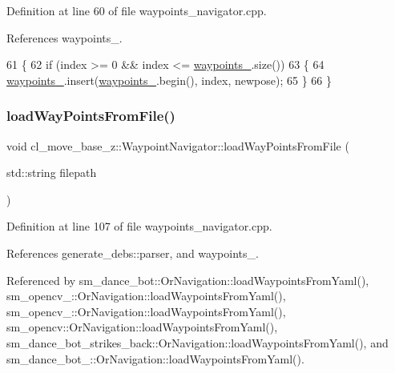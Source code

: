 Definition at line 60 of file waypoints\+\_\+navigator.\+cpp.



References waypoints\+\_\+.


\begin{DoxyCode}
61 \{
62   \textcolor{keywordflow}{if} (index >= 0 && index <= \hyperlink{classcl__move__base__z_1_1WaypointNavigator_a727f6a73e15ff5dc6bb3ffdf52c3d832}{waypoints\_}.size())
63   \{
64     \hyperlink{classcl__move__base__z_1_1WaypointNavigator_a727f6a73e15ff5dc6bb3ffdf52c3d832}{waypoints\_}.insert(\hyperlink{classcl__move__base__z_1_1WaypointNavigator_a727f6a73e15ff5dc6bb3ffdf52c3d832}{waypoints\_}.begin(), index, newpose);
65   \}
66 \}
\end{DoxyCode}
\mbox{\label{classcl__move__base__z_1_1WaypointNavigator_a18d74467ddf0e637a8d5a6e1fa2e93db}} 
\subsubsection{\texorpdfstring{load\+Way\+Points\+From\+File()}{loadWayPointsFromFile()}}
{\footnotesize\ttfamily void cl\+\_\+move\+\_\+base\+\_\+z\+::\+Waypoint\+Navigator\+::load\+Way\+Points\+From\+File (\begin{DoxyParamCaption}\item[{std\+::string}]{filepath }\end{DoxyParamCaption})}



Definition at line 107 of file waypoints\+\_\+navigator.\+cpp.



References generate\+\_\+debs\+::parser, and waypoints\+\_\+.



Referenced by sm\+\_\+dance\+\_\+bot\+::\+Or\+Navigation\+::load\+Waypoints\+From\+Yaml(), sm\+\_\+opencv\+\_\+::\+Or\+Navigation\+::load\+Waypoints\+From\+Yaml(), sm\+\_\+opencv\+\_\+::\+Or\+Navigation\+::load\+Waypoints\+From\+Yaml(), sm\+\_\+opencv\+::\+Or\+Navigation\+::load\+Waypoints\+From\+Yaml(), sm\+\_\+dance\+\_\+bot\+\_\+strikes\+\_\+back\+::\+Or\+Navigation\+::load\+Waypoints\+From\+Yaml(), and sm\+\_\+dance\+\_\+bot\+\_\+::\+Or\+Navigation\+::load\+Waypoints\+From\+Yaml().


